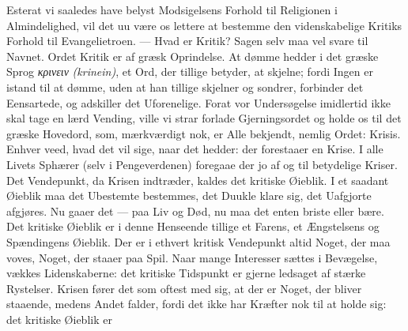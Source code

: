 \documentclass[12pt,a4paper]{book}
\begin{document}
Esterat vi saaledes have belyst Modsigelsens Forhold til Religionen i Almindelighed,
vil det uu være os lettere at bestemme den videnskabelige Kritiks Forhold til
Evangelietroen. --- Hvad er Kritik? Sagen selv maa vel svare til Navnet. Ordet Kritik
er af græsk Oprindelse. At dømme hedder i det græske Sprog \textit{κρινειν}
\textit{(krinein)}, et Ord, der tillige betyder, at skjelne; fordi Ingen er istand til
at dømme, uden at han tillige skjelner og sondrer, forbinder det Eensartede, og
adskiller det Uforenelige. Forat vor Undersøgelse imidlertid ikke skal tage en lærd
Vending, ville vi strar forlade Gjerningsordet og holde os til det græske Hovedord,
som, mærkværdigt nok, er Alle bekjendt, nemlig Ordet: Krisis. Enhver veed, hvad det vil
sige, naar det hedder: der forestaaer en Krise. I alle Livets Sphærer (selv i
Pengeverdenen) foregaae der jo af og til betydelige Kriser. Det Vendepunkt, da Krisen
indtræder, kaldes det kritiske Øieblik. I et saadant Øieblik maa det Ubestemte
bestemmes, det Duukle klare sig, det Uafgjorte afgjøres. Nu gaaer det --- paa Liv og
Død, nu maa det enten briste eller bære. Det kritiske Øieblik er i denne Henseende
tillige et Farens, et
Ængstelsens og Spændingens Øieblik. Der er i ethvert kritisk Vendepunkt altid Noget,
der maa voves, Noget, der staaer paa Spil. Naar mange Interesser sættes i Bevægelse,
vækkes Lidenskaberne: det kritiske Tidspunkt er gjerne ledsaget af stærke Rystelser.
Krisen fører det som oftest med sig, at der er Noget, der bliver staaende, medens Andet
falder, fordi det ikke har Kræfter nok til at holde sig: det kritiske Øieblik er
\end{document}
